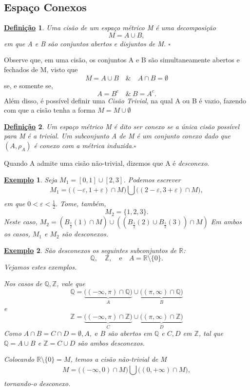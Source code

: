 \documentclass{article}
\newtheorem*{def*}{\underline{Defini\c c\~ao}}
\newtheorem{example}{\underline{Exemplo}}
\begin{document}
\subsection{Espaço Conexos}
 \begin{def*}
   Uma cisão de um espaço métrico M é uma decomposição 
     \[
       M = A\cup{B},
     \]
  em que A e B são conjuntos abertos e disjuntos de M. \(\square\)
 \end{def*}
  Observe que, em uma cisão, os conjuntos A e B são simultaneamente abertos e fechados 
de M, visto que 
  \[
    M = A\cup B\quad\&\quad A\cap B = \emptyset
  \]
se, e somente se, 
  \[
    A = B^{c} \quad\&\ B = A^{c}.
  \]
  Além disso, é possível definir uma \textit{Cisão Trivial}, na qual A ou B é vazio, fazendo com que
a cisão tenha a forma \(M = M\cup\emptyset\)
\begin{def*}
  Um espaço métrico M é dito ser conexo se a única cisão possível para M é a trivial. Um
subconjunto A de M é um conjunto conexo dado que \((A, \rho_{A})\) é conexo com a métrica induzida.\(\square\)
\end{def*}
  Quando A admite uma cisão não-trivial, dizemos que A é \textit{desconexo}.
 \begin{example}
   Seja \(M_{1} = [0,1]\cup [2, 3]\). Podemos escrever 
     \[
       M_{1} = \biggl((-\varepsilon , 1 + \varepsilon )\cap M\biggr)\bigcup_{}^{}{\biggl((2-\varepsilon , 3+\varepsilon )\cap M\biggr)},
     \]
em que \(0 < \varepsilon < \frac{1}{2}.\) Tome, também, 
  \[
    M_{2} = \{1, 2, 3\}.
  \]
  Neste caso, \(M_{2} = (B_{\frac{1}{2}}(1)\cap M)\cup ((B_{\frac{1}{2}}(2)\cup B_{\frac{1}{2}}(3))\cap M)\)
Em ambos os casos, \(M_{1}\) e \(M_{2}\) são desconexos.
 \end{example}
 \begin{example}
   São desconexos os seguintes subconjuntos de \(\mathbb{R}\): 
     \[
       \mathbb{Q}, \quad \mathbb{Z},\quad\text{e}\quad A = \mathbb{R}\setminus\{0\}.
     \]
Vejamos estes exemplos. 

  Nos casos de \(\mathbb{Q}, \mathbb{Z}\), vale que 
    \[
      \mathbb{Q} = \underbrace{\biggl((-\infty, \pi )\cap \mathbb{Q}\biggr)}_{A}\cup \underbrace{\biggl((\pi , \infty)\cap \mathbb{Q}\biggr)}_{B}
    \]
e 
    \[
    \mathbb{Z} = \underbrace{\biggl((-\infty, \pi )\cap \mathbb{Z}\biggr)}_{C}\cup \underbrace{\biggl((\pi , \infty)\cap \mathbb{Z}\biggr)}_{D}
    \]
  Como \(A\cap B = C\cap D = \emptyset, A,\text{ e }B\) são abertos em \(\mathbb{Q}\) e \(C, D\) em \(\mathbb{Z}\), tal que \(\mathbb{Q} = A\cup B\)
e \(\mathbb{Z} = C\cup D\) são ambos desconexos.

  Colocando \(\mathbb{R}\setminus\{0\} = M\), temos a cisão não-trivial de M
    \[
      M = \biggl((-\infty, 0)\cap M\biggr)\bigcup_{}^{}{\biggl((0, +\infty)\cap M\biggr)},
    \]
tornando-o desconexo.

 \end{example}
\end{document}
